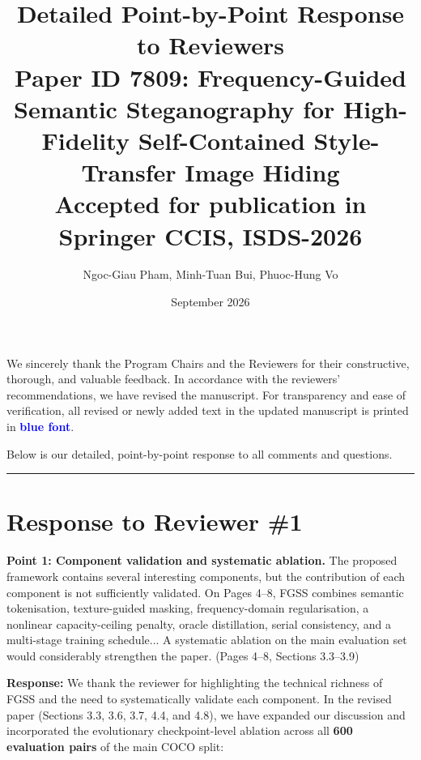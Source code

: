 \documentclass[11pt,a4paper]{article}
\title{\textbf{Detailed Point-by-Point Response to Reviewers}\\[0.4em]
\large \textbf{Paper ID 7809:} Frequency-Guided Semantic Steganography for High-Fidelity Self-Contained Style-Transfer Image Hiding\\[0.2em]
\normalsize Accepted for publication in Springer CCIS, ISDS-2026}
\author{Ngoc-Giau Pham, Minh-Tuan Bui, Phuoc-Hung Vo}
\date{September 2026}
\begin{document}
\maketitle

\noindent We sincerely thank the Program Chairs and the Reviewers for their constructive, thorough, and valuable feedback. In accordance with the reviewers' recommendations, we have revised the manuscript. For transparency and ease of verification, all revised or newly added text in the updated manuscript is printed in \textcolor{blue}{\textbf{blue font}}.

Below is our detailed, point-by-point response to all comments and questions.

\vspace{1em}
\hrule
\vspace{1.5em}

\section*{Response to Reviewer \#1}

\begin{revcomment}
\textbf{Point 1: Component validation and systematic ablation.} The proposed framework contains several interesting components, but the contribution of each component is not sufficiently validated. On Pages 4--8, FGSS combines semantic tokenisation, texture-guided masking, frequency-domain regularisation, a nonlinear capacity-ceiling penalty, oracle distillation, serial consistency, and a multi-stage training schedule... A systematic ablation on the main evaluation set would considerably strengthen the paper. (Pages 4--8, Sections 3.3--3.9)
\end{revcomment}

\noindent \textbf{Response:} We thank the reviewer for highlighting the technical richness of FGSS and the need to systematically validate each component. In the revised paper (Sections 3.3, 3.6, 3.7, 4.4, and 4.8), we have expanded our discussion and incorporated the evolutionary checkpoint-level ablation across all \textbf{600 evaluation pairs} of the main COCO split:
\end{document}
